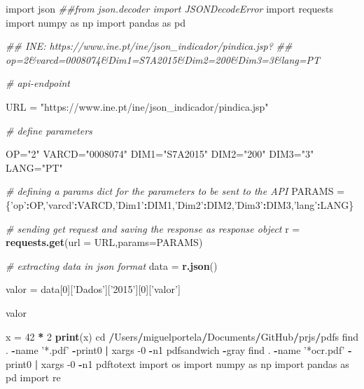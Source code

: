 \documentclass[
  12pt,
]{article}
\newenvironment{Shaded}{\begin{snugshade}}{\end{snugshade}}
\newcommand{\CommentTok}[1]{\textcolor[rgb]{0.56,0.35,0.01}{\textit{#1}}}
\newcommand{\DataTypeTok}[1]{\textcolor[rgb]{0.13,0.29,0.53}{#1}}
\newcommand{\DecValTok}[1]{\textcolor[rgb]{0.00,0.00,0.81}{#1}}
\newcommand{\KeywordTok}[1]{\textcolor[rgb]{0.13,0.29,0.53}{\textbf{#1}}}
\newcommand{\NormalTok}[1]{#1}
\newcommand{\OperatorTok}[1]{\textcolor[rgb]{0.81,0.36,0.00}{\textbf{#1}}}
\newcommand{\StringTok}[1]{\textcolor[rgb]{0.31,0.60,0.02}{#1}}
\begin{document}
\begin{Shaded}
\begin{Highlighting}[]
\NormalTok{import json}
\CommentTok{##from json.decoder import JSONDecodeError}
\NormalTok{import requests}
\NormalTok{import numpy as np}
\NormalTok{import pandas as pd}

\CommentTok{## INE: https://www.ine.pt/ine/json_indicador/pindica.jsp?}
\CommentTok{## op=2&varcd=0008074&Dim1=S7A2015&Dim2=200&Dim3=3&lang=PT}

\CommentTok{# api-endpoint }

\NormalTok{URL =}\StringTok{ "https://www.ine.pt/ine/json_indicador/pindica.jsp"}
  
\CommentTok{# define parameters}

\NormalTok{OP=}\StringTok{"2"}
\NormalTok{VARCD=}\StringTok{"0008074"}
\NormalTok{DIM1=}\StringTok{"S7A2015"}
\NormalTok{DIM2=}\StringTok{"200"}
\NormalTok{DIM3=}\StringTok{"3"}
\NormalTok{LANG=}\StringTok{"PT"}


\CommentTok{# defining a params dict for the parameters to be sent to the API }
\NormalTok{PARAMS =}\StringTok{ }\NormalTok{\{}\StringTok{'op'}\OperatorTok{:}\NormalTok{OP,}\StringTok{'varcd'}\OperatorTok{:}\NormalTok{VARCD,}\StringTok{'Dim1'}\OperatorTok{:}\NormalTok{DIM1,}\StringTok{'Dim2'}\OperatorTok{:}\NormalTok{DIM2,}\StringTok{'Dim3'}\OperatorTok{:}\NormalTok{DIM3,}\StringTok{'lang'}\OperatorTok{:}\NormalTok{LANG\} }
  
\CommentTok{# sending get request and saving the response as response object }
\NormalTok{r =}\StringTok{ }\KeywordTok{requests.get}\NormalTok{(}\DataTypeTok{url =}\NormalTok{ URL,}\DataTypeTok{params=}\NormalTok{PARAMS) }
  
\CommentTok{# extracting data in json format }
\NormalTok{data =}\StringTok{ }\KeywordTok{r.json}\NormalTok{() }

\NormalTok{valor =}\StringTok{ }\NormalTok{data[}\DecValTok{0}\NormalTok{][}\StringTok{'Dados'}\NormalTok{][}\StringTok{'2015'}\NormalTok{][}\DecValTok{0}\NormalTok{][}\StringTok{'valor'}\NormalTok{]}

\NormalTok{valor}

\NormalTok{x =}\StringTok{ }\DecValTok{42} \OperatorTok{*}\StringTok{ }\DecValTok{2}
\KeywordTok{print}\NormalTok{(x) }
\NormalTok{  cd }\OperatorTok{/}\NormalTok{Users}\OperatorTok{/}\NormalTok{miguelportela}\OperatorTok{/}\NormalTok{Documents}\OperatorTok{/}\NormalTok{GitHub}\OperatorTok{/}\NormalTok{prjs}\OperatorTok{/}\NormalTok{pdfs}
\NormalTok{    find . }\OperatorTok{-}\NormalTok{name }\StringTok{'*.pdf'} \OperatorTok{-}\NormalTok{print0 }\OperatorTok{|}\StringTok{ }\NormalTok{xargs }\DecValTok{-0} \OperatorTok{-}\NormalTok{n1 pdfsandwich }\OperatorTok{-}\NormalTok{gray}
\NormalTok{    find . }\OperatorTok{-}\NormalTok{name }\StringTok{'*ocr.pdf'} \OperatorTok{-}\NormalTok{print0 }\OperatorTok{|}\StringTok{ }\NormalTok{xargs }\DecValTok{-0} \OperatorTok{-}\NormalTok{n1 pdftotext}
\NormalTok{import os}
\NormalTok{import numpy as np}
\NormalTok{import pandas as pd}
\NormalTok{import re}


\end{Highlighting}
\end{Shaded}
\end{document}

